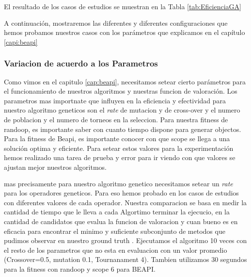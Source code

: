 

El resultado de los casos de estudios se muestran en la Tabla \ref{tab:EficienciaGA} 






A continuación, mostraremos las diferentes y diferentes configuraciones que hemos probamos nuestros casos con los parámetros que explicamos en el capítulo \ref{capi:beapi}





\subsubsection{Variacion de acuerdo a los Parametros}



Como vimos en el capitulo \ref{cap:beapi}, necesitamos setear cierto parámetros para el funcionamiento de nuestros algoritmos y nuestras funcion de valoración. Los parametros mas importnate que influyen en la eficiencia y efectividad para nuestro algoritmo geneticos son el \emph{rate} de mutacion y de cross-over y el numero de poblacion y el numero de torneos en la seleccion.
Para nuestra fitness de randoop, es importante saber con cuanto tiempo dispone para generar objectos.
Para la fitness de Beapi, es importante conocer con que scope se llega a una solución optima y eficiente.
Para setear estos valores para la experimentación hemos realizado una tarea de prueba y error para ir viendo con que valores se ajustan mejor nuestros algoritmos. 



mas precisamente  para nuestro algoritmo genetico necesitamos setear un \emph{rate} para los operadores geneticos. Para eso hemos probado en los casos de estudios con diferentes valores de cada operador. Nuestra comparacion se basa en medir la cantidad de tiempo que le lleva a cada Algortimo terminar la ejecucio, en la cantidad de candidatos que evalua la funcion de valoracion y cuan bueno es en eficacia para encontrar el minimo y suficiente subconjunto de metodos que pudimos observar en nuestro ground truth . Ejecutamos el algoritmo 10 veces con el resto de los parametros que no esta en evaluacion con un valor promedio (Crossover=0.5, mutation 0.1, Tournanament 4).
Tambien utilizamos 30 segundos para la fitness con randoop y scope 6 para BEAPI.

